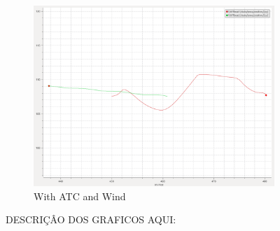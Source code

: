 \begin{figure}[H]
            \begin{subfigure}[b]{0.45\textwidth}
                \centering
                \includegraphics[width=\textwidth]{figs/plot_headOn_Wind_E.png}
                \caption{With \ac{ATC} and Wind}
                \label{fig:plot_headOn_Wind_E}
            \end{subfigure}
        
        \caption{DESCRIÇÂO DOS GRAFICOS AQUI: }
        \label{fig:headOn_E}
        \end{figure}
        
